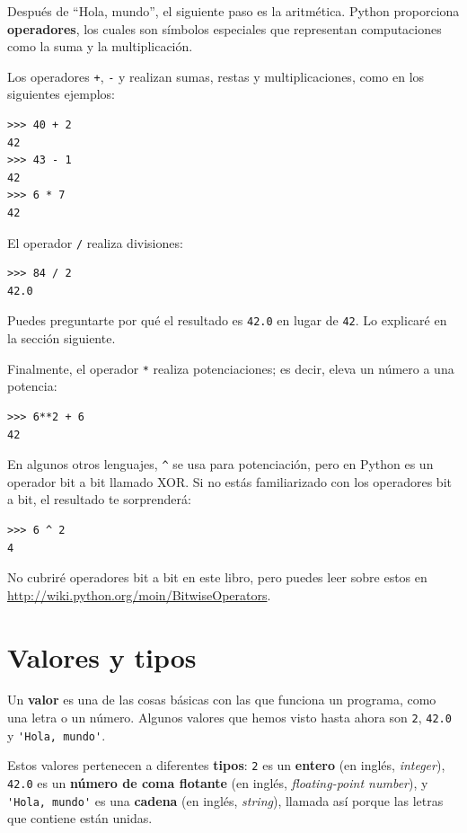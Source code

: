 \documentclass[10pt]{book}
\begin{document}
Después de ``Hola, mundo'', el siguiente paso es la aritmética.  Python
proporciona {\bf operadores}, los cuales son símbolos especiales que
representan computaciones como la suma y la multiplicación.

Los operadores {\tt +}, {\tt -} y {\tt *} realizan sumas,
restas y multiplicaciones, como en los siguientes ejemplos:

\begin{verbatim}
>>> 40 + 2
42
>>> 43 - 1
42
>>> 6 * 7
42
\end{verbatim}
%
El operador {\tt /} realiza divisiones:

\begin{verbatim}
>>> 84 / 2
42.0
\end{verbatim}
%
Puedes preguntarte por qué el resultado es {\tt 42.0} en lugar de {\tt 42}.
Lo explicaré en la sección siguiente.

Finalmente, el operador {\tt **} realiza potenciaciones; es decir,
eleva un número a una potencia:

\begin{verbatim}
>>> 6**2 + 6
42
\end{verbatim}
%
En algunos otros lenguajes, \verb"^" se usa para potenciación, pero
en Python es un operador bit a bit llamado XOR.  Si no estás familiarizado
con los operadores bit a bit, el resultado te sorprenderá:

\begin{verbatim}
>>> 6 ^ 2
4
\end{verbatim}
%
No cubriré
operadores bit a bit en este libro, pero puedes leer sobre
estos en \url{http://wiki.python.org/moin/BitwiseOperators}.


\section{Valores y tipos}

Un {\bf valor} es una de las cosas básicas con las que funciona un programa,
como una letra o un número.  Algunos valores que hemos visto hasta ahora son
{\tt 2}, {\tt 42.0} y \verb"'Hola, mundo'".

Estos valores pertenecen a diferentes {\bf tipos}: {\tt 2} es un {\bf entero}
(en inglés, {\em integer}), {\tt 42.0} es un {\bf número de coma flotante} (en
inglés, {\em floating-point number}), y \verb"'Hola, mundo'" es una {\bf
cadena} (en inglés, {\em string}), llamada así porque las letras que contiene están unidas.
\end{document}
